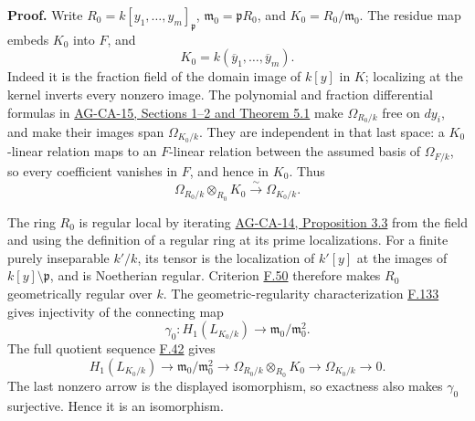\documentclass[11pt,a4paper,openany]{report}
\begin{document}
\textbf{Proof.} Write \(R_0=k[y_1,\ldots,y_m]_{\mathfrak p}\), \(\mathfrak m_0=\mathfrak pR_0\), and \(K_0=R_0/\mathfrak m_0\). The residue map embeds \(K_0\) into \(F\), and \[K_0=k(\overline y_1,\ldots,\overline y_m).\] Indeed it is the fraction field of the domain image of \(k[y]\) in \(K\); localizing at the kernel inverts every nonzero image. The polynomial and fraction differential formulas in \href{https://github.com/KokunoYumeto/open-math-courses/blob/d02d0a3669f42579db037cd44de1d113fdd770a1/docs/courses/AG-CA/src/kahler-differentials.md}{AG-CA-15, Sections 1--2 and Theorem 5.1} make \(\Omega_{R_0/k}\) free on \(dy_i\), and make their images span \(\Omega_{K_0/k}\). They are independent in that last space: a \(K_0\)-linear relation maps to an \(F\)-linear relation between the assumed basis of \(\Omega_{F/k}\), so every coefficient vanishes in \(F\), and hence in \(K_0\). Thus \[\Omega_{R_0/k}\otimes_{R_0}K_0\xrightarrow{\ \sim\ }\Omega_{K_0/k}.\]

The ring \(R_0\) is regular local by iterating \href{https://github.com/KokunoYumeto/open-math-courses/blob/d02d0a3669f42579db037cd44de1d113fdd770a1/docs/courses/AG-CA/src/regular-local-rings.md}{AG-CA-14, Proposition 3.3} from the field and using the definition of a regular ring at its prime localizations. For a finite purely inseparable \(k'/k\), its tensor is the localization of \(k'[y]\) at the images of \(k[y]\setminus\mathfrak p\), and is Noetherian regular. Criterion \hyperref[AG-RG-S05-algebra-lemma-geometrically-regular]{F.50} therefore makes \(R_0\) geometrically regular over \(k\). The geometric-regularity characterization \hyperref[AG-RG-S05-more-algebra-proposition-characterization-geometrically-regular]{F.133} gives injectivity of the connecting map \[\gamma_0:H_1(L_{K_0/k})\longrightarrow\mathfrak m_0/\mathfrak m_0^2.\] The full quotient sequence \hyperref[AG-RG-S05-algebra-lemma-exact-sequence-NL]{F.42} gives \[H_1(L_{K_0/k})\longrightarrow\mathfrak m_0/\mathfrak m_0^2
\longrightarrow\Omega_{R_0/k}\otimes_{R_0}K_0
\longrightarrow\Omega_{K_0/k}\longrightarrow0.\] The last nonzero arrow is the displayed isomorphism, so exactness also makes \(\gamma_0\) surjective. Hence it is an isomorphism.
\end{document}
